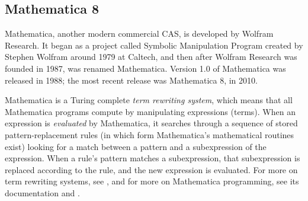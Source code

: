 \documentclass[12pt]{article}
\theoremstyle{plain}
\begin{document}
\subsection*{Mathematica 8}
Mathematica, another modern commercial CAS, is developed by Wolfram Research.
It began as a project called Symbolic Manipulation Program created by Stephen Wolfram around 1979 at Caltech,
and then after Wolfram Research was founded in 1987,
was renamed Mathematica.
Version 1.0 of Mathematica was released in 1988;
the most recent release was Mathematica 8, in 2010.

Mathematica is a Turing complete \emph{term rewriting system}, which means that all Mathematica programs compute by manipulating expressions (terms).
When an expression is \emph{evaluated} by Mathematica,
it searches through
a sequence of stored pattern-replacement rules (in which form Mathematica's mathematical routines exist) looking for a match between a pattern and a subexpression of the expression.
When a rule's pattern matches a subexpression, that subexpression is replaced according to the rule, and the new expression is evaluated.
For more on term rewriting systems, see \cite{term}, and for more on Mathematica programming, see its documentation and \cite{trott}.
\end{document}
